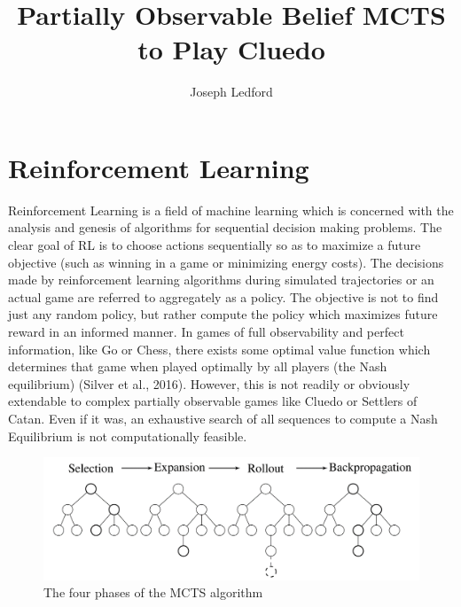 \documentclass[a4paper,12pt]{proposal}
\title{Partially Observable Belief MCTS to Play Cluedo}
\author{Joseph Ledford}
\begin{document}
\maketitle 

\setlength{\parindent}{4em}
\setlength{\parskip}{1em}


\setcounter{tocdepth}{2}


\clearpage


\setlength{\parskip}{1ex} 


\section{Reinforcement Learning}
Reinforcement Learning is a field of machine learning which is concerned with the analysis and genesis of algorithms for sequential decision making problems. The clear goal of RL is to choose actions sequentially so as to maximize a future objective (such as winning in a game or minimizing energy costs). The decisions made by reinforcement learning algorithms during simulated trajectories or an actual game are referred to aggregately as a policy. The objective is not to find just any random policy, but rather compute the policy which maximizes future reward in an informed manner. In games of full observability and perfect information, like Go or Chess, there exists some optimal value function which determines that game when played optimally by all players (the Nash equilibrium) (Silver et al., 2016). However, this is not readily or obviously extendable to complex partially observable games like Cluedo or Settlers of Catan. Even if it was, an exhaustive search of all sequences to compute a Nash Equilibrium is not computationally feasible. 
\begin{figure}[h]
\caption{The four phases of the MCTS algorithm}
\centering
\includegraphics[scale=.825]{figures/MCTS}
\end{figure}
\end{document}
